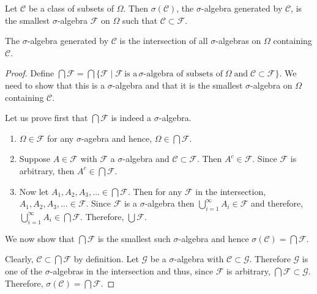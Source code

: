 \begin{definition}
Let $\mathcal C$ be a class of subsets of $\Omega$. Then $\sigma(\mathcal C)$, the $\sigma$-algebra 
generated by $\mathcal C$, is the smallest $\sigma$-algebra $\mathcal F$ on $\Omega$ such that $\mathcal C\subset \mathcal F$.
\end{definition}

\begin{theorem}
The $\sigma$-algebra generated by $\mathcal C$ is the intersection of all $\sigma$-algebras on 
$\Omega$ containing $\mathcal C$.
\end{theorem}

\begin{proof}
Define $\bigcap\mathcal F=\bigcap \{\mathcal F \mid \mathcal F\, \text{is a}\, \sigma\text{-algebra of subsets of}\; \Omega\; \text{and}\; \mathcal C\subset \mathcal F  \}$. We need to show that this is a $\sigma$-algebra and that it is the smallest $\sigma$-algebra on $\Omega$ containing $\mathcal C$.

Let us prove first that $\bigcap \mathcal F$ is indeed a $\sigma$-algebra.
\begin{enumerate}[label=(\emph{\roman*})]
\item $\Omega \in \mathcal F$ for any $\sigma$-agebra and hence, $\Omega\in\bigcap \mathcal F$.
\item Suppose $A\in \mathcal F$ with $\mathcal F$ a $\sigma$-algebra and $\mathcal C\subset \mathcal F$. Then $A^c\in\mathcal F$. Since $\mathcal F$ is arbitrary, then $A^c\in\bigcap\mathcal F$.
\item Now let $A_1, A_2, A_3,\ldots \in \bigcap\mathcal F$. Then for any $\mathcal F$ in the intersection, $A_1, A_2, A_3, \ldots \in \mathcal F$. Since $\mathcal F$ is a $\sigma$-algebra then $\bigcup_{i=1}^\infty A_i\in\mathcal F$ and therefore, $\bigcup_{i=1}^\infty A_i\in \bigcap \mathcal F$. Therefore, $\bigcup \mathcal F$.
\end{enumerate}
We now show that $\bigcap\mathcal F$ is the smallest such $\sigma$-algebra and hence $\sigma(\mathcal C)=\bigcap\mathcal F$.

Clearly, $\mathcal C\subset \bigcap \mathcal F$ by definition. Let $\mathcal G$ be a $\sigma$-algebra with $\mathcal C\subset \mathcal G$. Therefore $\mathcal G$ is one of the $\sigma$-algebras in the intersection and thus, since $\mathcal F$ is arbitrary, $\bigcap \mathcal F\subset \mathcal G$. Therefore, $\sigma(\mathcal C)=\bigcap \mathcal F$.
\end{proof}


